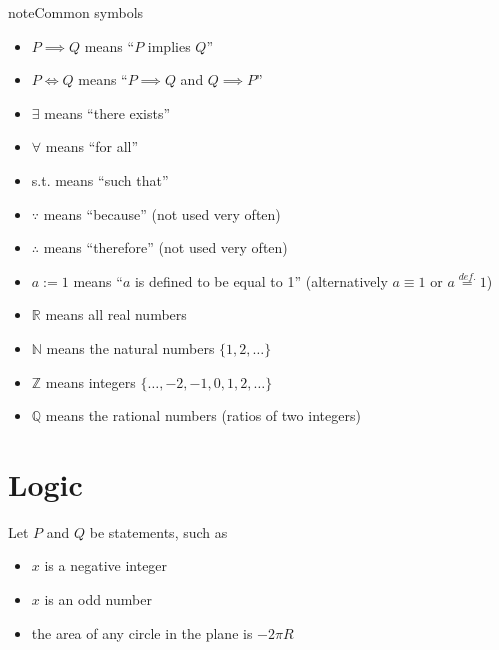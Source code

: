 \documentclass[letterpaper,10pt,english]{jupyterBook}
\begin{document}
\begin{sphinxadmonition}{note}{Common symbols}
\begin{itemize}
\item {} 
\sphinxAtStartPar
\(P \implies Q\) means “\(P\) implies \(Q\)”

\item {} 
\sphinxAtStartPar
\(P \iff Q\) means “\(P \implies Q\) and \(Q \implies P\)”

\item {} 
\sphinxAtStartPar
\(\exists\) means “there exists”

\item {} 
\sphinxAtStartPar
\(\forall\) means “for all”

\item {} 
\sphinxAtStartPar
s.t. means “such that”

\item {} 
\sphinxAtStartPar
\(\because\) means “because” (not used very often)

\item {} 
\sphinxAtStartPar
\(\therefore\) means “therefore” (not used very often)

\item {} 
\sphinxAtStartPar
\(a := 1\) means “\(a\) is defined to be equal to 1” (alternatively \(a \equiv 1\) or
\(a \stackrel{def.}{=} 1 \))

\item {} 
\sphinxAtStartPar
\(\mathbb{R}\) means all real numbers

\item {} 
\sphinxAtStartPar
\(\mathbb{N}\) means the natural numbers \(\{1, 2, \ldots \}\)

\item {} 
\sphinxAtStartPar
\(\mathbb{Z}\) means integers \(\{\ldots, -2,-1,0,1, 2, \ldots \}\)

\item {} 
\sphinxAtStartPar
\(\mathbb{Q}\) means the rational numbers (ratios of two integers)

\end{itemize}
\end{sphinxadmonition}


\section{Logic}
\label{\detokenize{03.set_theory:logic}}
\sphinxAtStartPar
Let \(P\) and \(Q\) be statements, such as
\begin{itemize}
\item {} 
\sphinxAtStartPar
\(x\) is a negative integer

\item {} 
\sphinxAtStartPar
\(x\) is an odd number

\item {} 
\sphinxAtStartPar
the area of any circle in the plane is \(-2 \pi R\)

\end{itemize}
\end{document}
